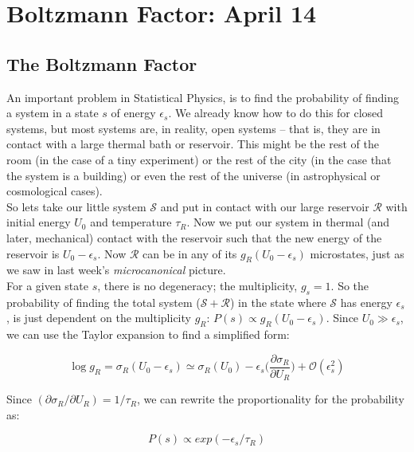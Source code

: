 \section{Boltzmann Factor: April 14}


\subsection{The Boltzmann Factor}
\label{s:BoltzmannFactor}
An important problem in Statistical Physics, is to find the probability
of finding a system in a state $s$ of energy $\epsilon_s$. We already
know how to do this for closed systems, but most systems are, in reality, open systems -- that is, they are in contact with a large thermal bath or reservoir. This might be the rest of the room (in the case of a tiny experiment) or the rest of the city (in the case that the system is a building) or even the rest of the universe (in astrophysical or cosmological cases). \\

So lets take our little system $\mathcal{S}$ and put in contact with our large reservoir $\mathcal{R}$ with initial energy $U_0$ and temperature $\tau_R$. Now we put our system in thermal (and later, mechanical) contact with the reservoir such that the new energy of the reservoir is $U_0 - \epsilon_s$. Now 
$\mathcal{R}$ can be in any of its $g_R(U_0 - \epsilon_s)$ microstates, just as we saw in last week's \textit{microcanonical} picture. \\

For a given state $s$, there is no degeneracy; the multiplicity, $g_s = 1$. So the probability of finding the total system ($\mathcal{S} + \mathcal{R}$) in the state where $\mathcal{S}$ has energy $\epsilon_s$, is just dependent on the multiplicity $g_R$: $P(s) \propto g_R(U_0 - \epsilon_s)$. Since 
$U_0 \gg \epsilon_s$, we can use the Taylor expansion to find a simplified form:

\begin{equation}
\log g_R = \sigma_R(U_0 - \epsilon_s) \simeq 
	\sigma_R(U_0) - 
	\epsilon_s \bigg(\frac{\partial \sigma_R}{\partial U_R}\bigg) +
	\mathcal{O}(\epsilon_s^2)
\end{equation}

Since $(\partial \sigma_R/\partial U_R) = 1/\tau_R$, we can rewrite the proportionality for the probability as:

\begin{equation}
P(s) \propto exp(-\epsilon_s/\tau_R)
\end{equation}

